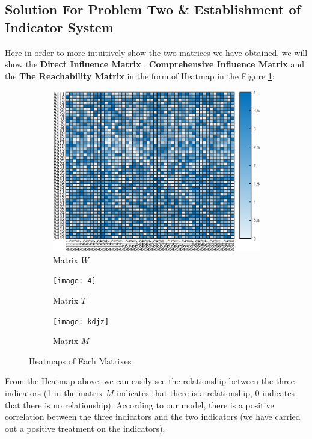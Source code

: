 \documentclass[12pt]{article}  %
\begin{document}
\subsection{Solution For Problem Two \& Establishment of Indicator System}
Here in order to more intuitively show the two matrices we have obtained, we will show the \textbf{Direct Influence Matrix} , \textbf{Comprehensive Influence Matrix}  and the \textbf{The Reachability Matrix}  in the form of Heatmap in the Figure \ref{heatmap}:
\begin{figure}[htbp]
\centering
\begin{subfigure}[b]{.32\textwidth}
\includegraphics[width=\textwidth]{img/h2.eps}
\caption{Matrix $W$}
\end{subfigure}
\begin{subfigure}[b]{.32\textwidth}
\texttt{[image: 4]}
\caption{Matrix $T$}
\end{subfigure}
\begin{subfigure}[b]{.32\textwidth}
\texttt{[image: kdjz]}
\caption{Matrix $M$}
\end{subfigure}
\caption{Heatmaps of Each Matrixes}
\label{heatmap}
\end{figure}

From the Heatmap above, we can easily see the relationship between the three indicators (1 in the matrix $M$ indicates that there is a relationship, 0 indicates that there is no relationship). According to our model, there is a positive correlation between the three indicators and the two indicators (we have carried out a positive treatment on the indicators).
\end{document}

